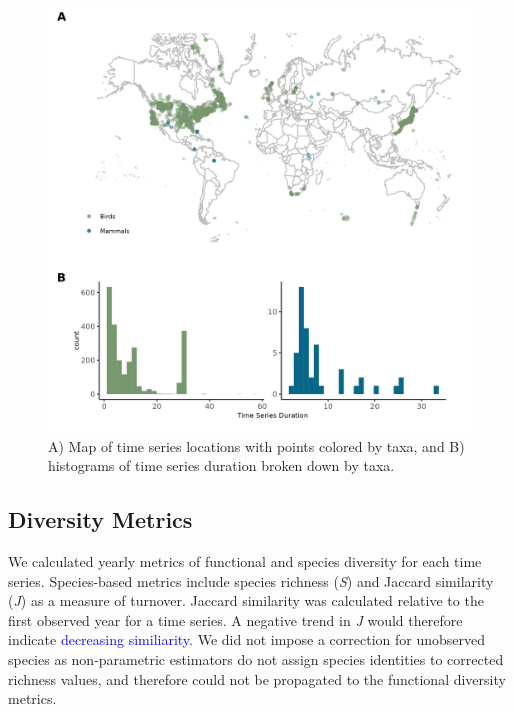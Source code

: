 \documentclass{article}
\begin{document}
\begin{figure}
\includegraphics[width=\textwidth]{../../figures/study_map_hist} \caption{A) Map of time series locations with points colored by taxa, and B) histograms of time series duration broken down by taxa.}\label{fig:taxaMap}
\end{figure}

\hypertarget{diversity-metrics}{%
\subsection{Diversity Metrics}\label{diversity-metrics}}

We calculated yearly metrics of functional and species diversity for
each time series. Species-based metrics include species richness
(\emph{S}) and Jaccard similarity (\emph{J}) as a measure of turnover.
Jaccard similarity was calculated relative to the first observed year
for a time series. A negative trend in \emph{J} would therefore indicate
\textcolor{blue}{decreasing similiarity}. We did not impose a correction
for unobserved species as non-parametric estimators do not assign
species identities to corrected richness values, and therefore could not
be propagated to the functional diversity metrics.
\end{document}

